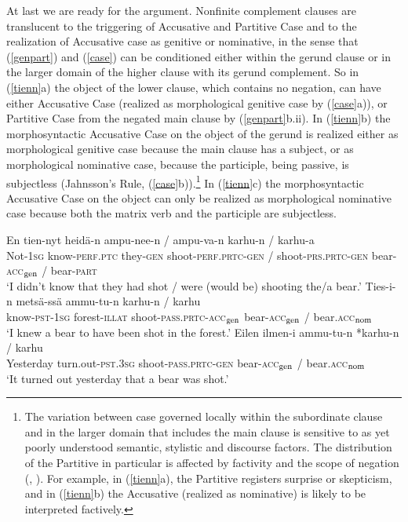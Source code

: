 \documentclass[output=paper,
modfonts
]{LSP/langsci}
\newcommand{\rf}[1]{(\ref{#1})}
\newcommand{\rfa}[2]{(\ref{#1}{#2})}
\def\trf#1{$_{\textrm{\scriptsize{#1}}}$}
\begin{document}
At last we are ready for the argument.  Nonfinite complement clauses are translucent to the
triggering of Accusative and Partitive Case and to the realization of Accusative case as
genitive or nominative, in the sense that \rf{genpart} and \rf{case} can be conditioned
either within the gerund clause or in the larger domain of the higher clause with its gerund
complement.
So in \rfa{tienn}{a} the object of the lower clause, which contains no negation, can have
either Accusative Case (realized as morphological genitive case by \rfa{case}{a}), or Partitive
Case from the negated main clause by \rfa{genpart}{b.ii}. In \rfa{tienn}{b} the morphosyntactic
Accusative Case on the object of the gerund is realized either as morphological genitive case
because the main clause has a subject, or as morphological nominative case, because the
participle, being passive, is subjectless (Jahnsson's Rule, \rfa{case}{b}).\footnote{The
  variation between case governed locally within the subordinate clause and in the larger
  domain that includes the main clause is sensitive to as yet poorly understood semantic,
  stylistic and discourse factors.  The distribution of the Partitive in particular is affected
  by factivity and the scope of negation (\citealt[31]{hakulinen1970}, \citealt[365]{hakulinen1979}).  For example, in
  \rfa{tienn}{a}, the Partitive registers surprise or skepticism, and in \rfa{tienn}{b} the
  Accusative (realized as nominative) is likely to be interpreted factively.} In
\rfa{tienn}{c} the morphosyntactic Accusative Case on the object can only be realized as
morphological nominative case because both the matrix verb and the participle are subjectless.
\begin{exe}
\ex\label{tienn}
	\ea \gll  En tien-nyt heidä-n ampu-nee-n / ampu-va-n karhu-n / karhu-a \hfill \\
		Not-\textsc{1sg} know-\textsc{perf}.\textsc{ptc} they-\textsc{gen} shoot-\textsc{perf}.\textsc{prtc}-\textsc{gen} / 
		shoot-\textsc{prs}.\textsc{prtc}-\textsc{gen} bear-\textsc{acc\trf{gen}} / bear-\textsc{part} \\
		\glt `I didn't know that they had shot / were (would be) shooting the/a bear.' 
	\ex   \gll Ties-i-n metsä-ssä ammu-tu-n  karhu-n / karhu  \\
  		know-\textsc{pst}-\textsc{1sg} forest-\textsc{illat}  shoot-\textsc{pass}.\textsc{prtc}-\textsc{acc\trf{gen}}
  		bear-\textsc{acc\trf{gen}}  / bear.\textsc{acc\trf{nom}}  \\ 
  		\glt `I knew a bear to have been shot in the forest.' \hfill 
 	\ex \gll Eilen ilmen-i ammu-tu-n *karhu-n / karhu  \\
		Yesterday turn.out-\textsc{pst}.\textsc{3sg}  shoot-\textsc{pass}.\textsc{prtc}-\textsc{gen} bear-\textsc{acc\trf{gen}} / bear.\textsc{acc\trf{nom}} \\
		\glt `It turned out yesterday that a bear was shot.'
	\z 
\end{exe}
\end{document}
